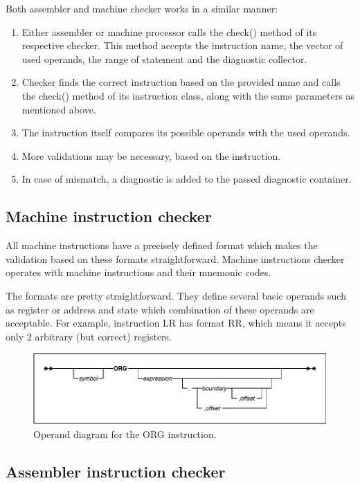 Both assembler and machine checker works in a similar manner:
\begin{enumerate}
	\item Either assembler or machine processor calls the check() method of its respective checker. This method accepts the instruction name, the vector of used operands, the range of statement and the diagnostic collector.
	\item Checker finds the correct instruction based on the provided name and calls the check() method of its instruction class, along with the same parameters as mentioned above.
	\item The instruction itself compares its possible operands with the used operands.
	\item More validations may be necessary, based on the instruction.
	\item In case of mismatch, a diagnostic is added to the passed diagnostic container.
\end{enumerate}

\subsection{Machine instruction checker}

All machine instructions have a precisely defined format which makes the validation based on these formats straightforward. Machine instructions checker operates with machine instructions and their mnemonic codes.

The formats are pretty straightforward. They define several basic operands such as register or address and state which combination of these operands are acceptable. For example, instruction LR has format RR, which means it accepts only 2 arbitrary (but correct) registers. 

\begin{figure}
	\centering
	\includegraphics[width=\textwidth]{img/org_diagram}
	\caption{Operand diagram for the ORG instruction.}
	
	\label{fig01:check}
\end{figure}

\subsection{Assembler instruction checker}
\label{sub:asm_check}

